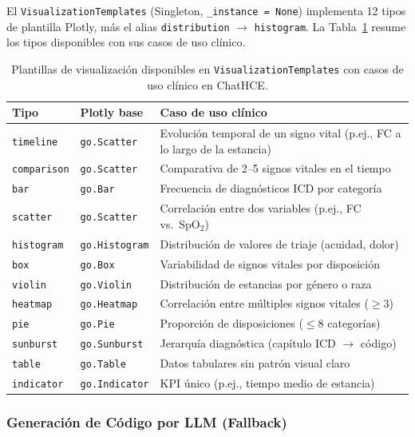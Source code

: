 El \texttt{VisualizationTemplates} (Singleton, \texttt{\_instance = None}) implementa 12 tipos de plantilla Plotly, más el alias \texttt{distribution} $\rightarrow$ \texttt{histogram}. La Tabla~\ref{tab:viz_templates} resume los tipos disponibles con sus casos de uso clínico.

\begin{table}[H]
\centering
\caption{Plantillas de visualización disponibles en \texttt{VisualizationTemplates} con casos de uso clínico en ChatHCE.}
\label{tab:viz_templates}
\footnotesize
\begin{tabularx}{\columnwidth}{llX}
\toprule
\textbf{Tipo} & \textbf{Plotly base} & \textbf{Caso de uso clínico} \\
\midrule
\texttt{timeline} & \texttt{go.Scatter} & Evolución temporal de un signo vital (p.ej., FC a lo largo de la estancia) \\
\texttt{comparison} & \texttt{go.Scatter} & Comparativa de 2--5 signos vitales en el tiempo \\
\texttt{bar} & \texttt{go.Bar} & Frecuencia de diagnósticos ICD por categoría \\
\texttt{scatter} & \texttt{go.Scatter} & Correlación entre dos variables (p.ej., FC vs.\ SpO$_2$) \\
\texttt{histogram} & \texttt{go.Histogram} & Distribución de valores de triaje (acuidad, dolor) \\
\texttt{box} & \texttt{go.Box} & Variabilidad de signos vitales por disposición \\
\texttt{violin} & \texttt{go.Violin} & Distribución de estancias por género o raza \\
\texttt{heatmap} & \texttt{go.Heatmap} & Correlación entre múltiples signos vitales ($\geq 3$) \\
\texttt{pie} & \texttt{go.Pie} & Proporción de disposiciones ($\leq 8$ categorías) \\
\texttt{sunburst} & \texttt{go.Sunburst} & Jerarquía diagnóstica (capítulo ICD $\rightarrow$ código) \\
\texttt{table} & \texttt{go.Table} & Datos tabulares sin patrón visual claro \\
\texttt{indicator} & \texttt{go.Indicator} & KPI único (p.ej., tiempo medio de estancia) \\
\bottomrule
\end{tabularx}
\end{table}

\subsubsection{Generación de Código por LLM (Fallback)}

